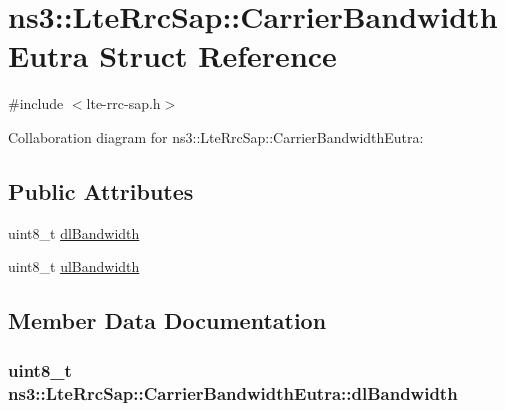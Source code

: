 \hypertarget{structns3_1_1LteRrcSap_1_1CarrierBandwidthEutra}{}\section{ns3\+:\+:Lte\+Rrc\+Sap\+:\+:Carrier\+Bandwidth\+Eutra Struct Reference}
\label{structns3_1_1LteRrcSap_1_1CarrierBandwidthEutra}


{\ttfamily \#include $<$lte-\/rrc-\/sap.\+h$>$}



Collaboration diagram for ns3\+:\+:Lte\+Rrc\+Sap\+:\+:Carrier\+Bandwidth\+Eutra\+:
\subsection*{Public Attributes}
\begin{DoxyCompactItemize}
\item 
uint8\+\_\+t \hyperlink{structns3_1_1LteRrcSap_1_1CarrierBandwidthEutra_a38e64fc8639d7db7804a369397e9e283}{dl\+Bandwidth}
\item 
uint8\+\_\+t \hyperlink{structns3_1_1LteRrcSap_1_1CarrierBandwidthEutra_a14b58cc270f1cfa97f8f4965a151bf26}{ul\+Bandwidth}
\end{DoxyCompactItemize}


\subsection{Member Data Documentation}
\subsubsection[{\texorpdfstring{dl\+Bandwidth}{dlBandwidth}}]{\setlength{\rightskip}{0pt plus 5cm}uint8\+\_\+t ns3\+::\+Lte\+Rrc\+Sap\+::\+Carrier\+Bandwidth\+Eutra\+::dl\+Bandwidth}\hypertarget{structns3_1_1LteRrcSap_1_1CarrierBandwidthEutra_a38e64fc8639d7db7804a369397e9e283}{}\label{structns3_1_1LteRrcSap_1_1CarrierBandwidthEutra_a38e64fc8639d7db7804a369397e9e283}
